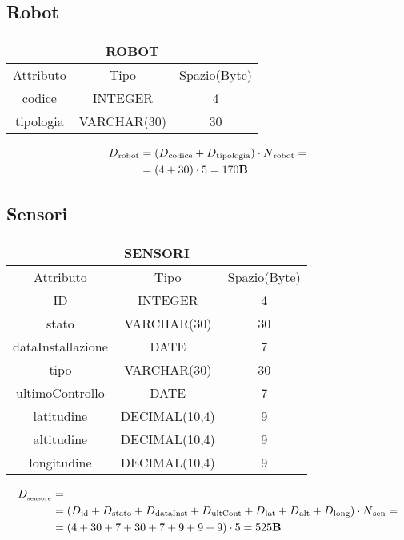 \subsection{Robot}
\begin{tabular}{ |c|c|c|}
  \hline
  \multicolumn{3}{|c|}{\textbf{ROBOT}}\\
  \hline
  Attributo & Tipo & Spazio(Byte) \\
  \hline
  codice & INTEGER & 4\\
  tipologia & VARCHAR(30) & 30\\
  \hline
\end{tabular}
\begin{equation}
  \begin{aligned}
    D{\text{\textsubscript{robot}}} &=(D{\text{\textsubscript{codice}}}+D{\text{\textsubscript{tipologia}}})\cdot N{\text{\textsubscript{robot}}}=\\
    &=(4+30)\cdot 5 = 170\textbf{B}
  \end{aligned}
\end{equation}
\subsection{Sensori}
\begin{tabular}{ |c|c|c|}
  \hline
  \multicolumn{3}{|c|}{\textbf{SENSORI}}\\
  \hline
  Attributo & Tipo & Spazio(Byte) \\
  \hline
  ID & INTEGER & 4 \\
  stato & VARCHAR(30) & 30\\
  dataInstallazione & DATE & 7\\
  tipo & VARCHAR(30) & 30\\
  ultimoControllo & DATE & 7\\
  latitudine & DECIMAL(10,4) & 9\\
  altitudine & DECIMAL(10,4) & 9\\
  longitudine & DECIMAL(10,4) & 9\\
  \hline
\end{tabular}
\begin{equation}
  \begin{aligned}
    D_{\text{\textsubscript{sensore}}} &=\\
    &=(D{\text{\textsubscript{id}}}+D{\text{\textsubscript{stato}}}+D{\text{\textsubscript{dataInst}}}+D{\text{\textsubscript{ultCont}}}+D{\text{\textsubscript{lat}}}+D{\text{\textsubscript{alt}}}+D{\text{\textsubscript{long}}})\cdot N{\text{\textsubscript{sen}}}=\\
    &=(4+30+7+30+7+9+9+9)\cdot 5 = 525\textbf{B}
  \end{aligned}
\end{equation}

